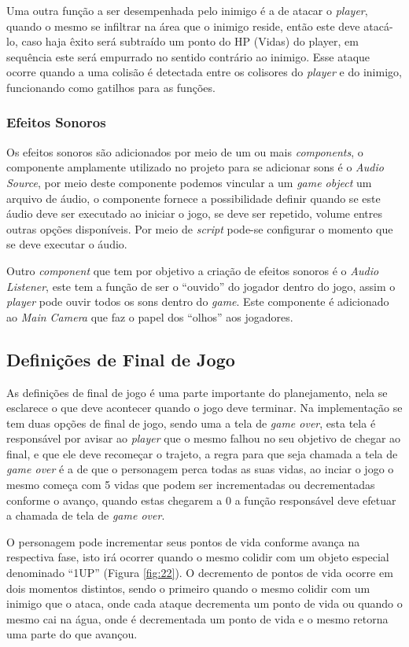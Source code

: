 \documentclass[
	12pt,				%
    oneside,			%
	a4paper,			%
	english,			%
	french,				%
	spanish,			%
	brazil,				%
	]{abntex2}
\begin{document}
				
				Uma outra função a ser desempenhada pelo inimigo é a de atacar o \textit{player}, quando o mesmo se infiltrar na área que o inimigo reside, então este deve atacá-lo, caso haja êxito será subtraído um ponto do HP (Vidas) do player, em sequência este será empurrado no sentido contrário ao inimigo. Esse ataque ocorre quando a uma colisão é detectada entre os colisores do \textit{player} e do inimigo, funcionando como gatilhos para as funções.
							
				
			\subsubsection{Efeitos Sonoros}
				Os efeitos sonoros são adicionados por meio de um ou mais \textit{components}, o componente amplamente utilizado no projeto para se adicionar sons é o \textit{Audio Source}, por meio deste componente podemos vincular a um \textit{game object} um arquivo de áudio, o componente fornece a possibilidade definir quando se este áudio deve ser executado ao iniciar o jogo, se deve ser repetido, volume entres outras opções disponíveis. Por meio de \textit{script} pode-se configurar o momento que se deve executar o áudio.
				
				Outro \textit{component} que tem por objetivo a criação de efeitos sonoros é o \textit{Audio Listener}, este tem a função de ser o “ouvido” do jogador dentro do jogo, assim o \textit{player} pode ouvir todos os sons dentro do \textit{game}. Este componente é adicionado ao \textit{Main Camera} que faz o papel dos “olhos” aos jogadores.		
	
	\subsection{Definições de Final de Jogo}
		As definições de final de jogo é uma parte importante do planejamento, nela se esclarece o que deve acontecer quando o jogo deve terminar. Na implementação se tem duas opções de final de jogo, sendo uma a tela de \textit{game over}, esta tela é responsável por avisar ao \textit{player} que o mesmo falhou no seu objetivo de chegar ao final, e que ele deve recomeçar o trajeto, a regra para que seja chamada a tela de \textit{game over} é a de que o personagem perca todas as suas vidas, ao inciar o jogo o mesmo começa com 5 vidas que podem ser incrementadas ou decrementadas conforme o avanço, quando estas chegarem a 0 a função responsável deve efetuar a chamada de tela de \textit{game over}.
		
		O personagem pode incrementar seus pontos de vida conforme avança na respectiva fase, isto irá ocorrer quando o mesmo colidir com um objeto especial denominado “1UP” (Figura \ref*{fig:22}). O decremento de pontos de vida ocorre em dois momentos distintos, sendo o primeiro quando o mesmo colidir com um inimigo que o ataca, onde cada ataque decrementa um ponto de vida ou quando o mesmo cai na água, onde é decrementada um ponto de vida e o mesmo retorna uma parte do que avançou.
		
\end{document}
